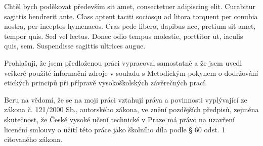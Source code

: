 \documentclass[czech,master,unicode]{ctufit-thesis}
\theoremstyle{plain}
\theoremstyle{definition}
\theoremstyle{remark}
\numberwithin{theorem}{chapter}
\begin{document}
 
\frontmatter\frontmatterinit %


\thispagestyle{empty}\cleardoublepage\maketitle %

\imprintpage %

\tableofcontents %
\listoffigures %
\begingroup
\let\clearpage\relax
\listoftables %
\lstlistoflistings %
\endgroup

\begin{acknowledgmentpage}
	Chtěl bych poděkovat především sit amet, consectetuer adipiscing elit. Curabitur sagittis hendrerit ante. Class aptent taciti sociosqu ad litora torquent per conubia nostra, per inceptos hymenaeos. Cras pede libero, dapibus nec, pretium sit amet, tempor quis. Sed vel lectus. Donec odio tempus molestie, porttitor ut, iaculis quis, sem. Suspendisse sagittis ultrices augue.
\end{acknowledgmentpage} 


\begin{declarationpage}
Prohlašuji, že jsem předloženou práci vypracoval samostatně a že jsem uvedl veškeré použité
informační zdroje v souladu s Metodickým pokynem o dodržování etických principů při přípravě
vysokoškolských závěrečných prací.

Beru na vědomí, že se na moji práci vztahují práva a povinnosti vyplývající ze zákona č. 121/2000 Sb.,
autorského zákona, ve znění pozdějších předpisů, zejména skutečnost, že České vysoké učení
technické v Praze má právo na uzavření licenční smlouvy o užití této práce jako školního díla podle §
60 odst. 1 citovaného zákona.
\end{declarationpage}
\end{document}
